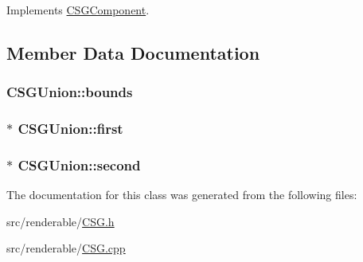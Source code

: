 Implements \hyperlink{classCSGComponent_a4299365f2bab69272af9de4f2bee7cdb}{C\+S\+G\+Component}.



\subsection{Member Data Documentation}
\subsubsection[{\texorpdfstring{bounds}{bounds}}]{ C\+S\+G\+Union\+::bounds\hspace{0.3cm}{\ttfamily [private]}}\hypertarget{classCSGUnion_a40b5e5f99930721873da62db801e0c90}{}\label{classCSGUnion_a40b5e5f99930721873da62db801e0c90}
\subsubsection[{\texorpdfstring{first}{first}}]{$\ast$ C\+S\+G\+Union\+::first\hspace{0.3cm}{\ttfamily [private]}}\hypertarget{classCSGUnion_ac2042150362043f8646dc9f13e98df1a}{}\label{classCSGUnion_ac2042150362043f8646dc9f13e98df1a}
\subsubsection[{\texorpdfstring{second}{second}}]{$\ast$ C\+S\+G\+Union\+::second\hspace{0.3cm}{\ttfamily [private]}}\hypertarget{classCSGUnion_abb2099a585c204bdcf3c2d0c8004438e}{}\label{classCSGUnion_abb2099a585c204bdcf3c2d0c8004438e}


The documentation for this class was generated from the following files\+:\begin{DoxyCompactItemize}
\item 
src/renderable/\hyperlink{CSG_8h}{C\+S\+G.\+h}\item 
src/renderable/\hyperlink{CSG_8cpp}{C\+S\+G.\+cpp}\end{DoxyCompactItemize}
